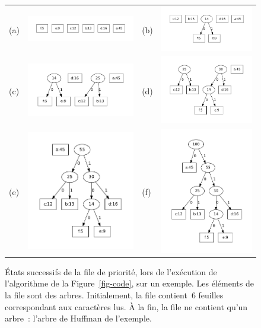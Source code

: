 \documentclass[12pt]{article}
\begin{document}
\begin{figure}[h!t]
\begin{tabular}{llll}
(a) & \includegraphics[width=.35\textwidth]{stepa.pdf} &
(b) & \includegraphics[width=.35\textwidth]{stepb.pdf} \\
(c) & \includegraphics[width=.35\textwidth]{stepc.pdf} &
(d) & \includegraphics[width=.35\textwidth]{stepd.pdf} \\
(e) & \includegraphics[width=.35\textwidth]{stepe.pdf} &
(f) & \includegraphics[width=.35\textwidth]{stepf.pdf} 
\end{tabular}
\caption{\footnotesize États successifs de la file de priorité, lors de l'exécution de l'algorithme de la Figure~\ref{fig-code}, sur un exemple. Les éléments de la file sont des arbres. Initialement, la file contient~$6$ feuilles correspondant aux caractères lus. À la fin, la file ne contient qu'un arbre~: l'arbre de Huffman de l'exemple.}
\label{fig-fx}
\end{figure}
\end{document}
